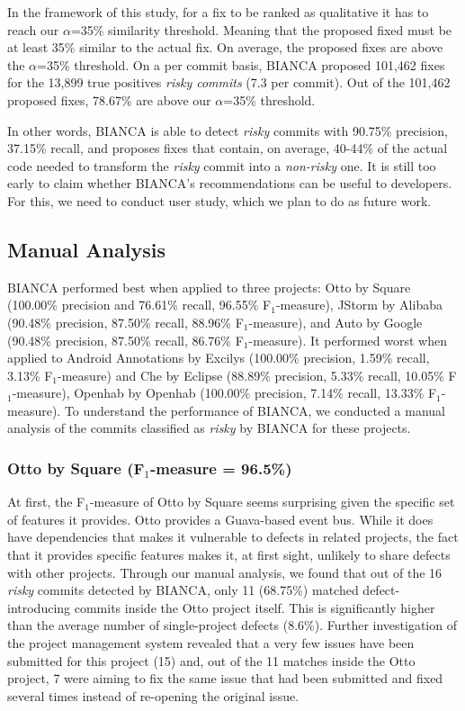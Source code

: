 In the framework of this study, for a fix to be ranked as qualitative it
has to reach our \(\alpha\)=35\% similarity threshold. Meaning that the
proposed fixed must be at least 35\% similar to the actual fix. On
average, the proposed fixes are above the \(\alpha\)=35\% threshold. On
a per commit basis, BIANCA proposed 101,462 fixes for the 13,899 true
positives \emph{risky commits} (7.3 per commit). Out of the 101,462
proposed fixes, 78.67\% are above our \(\alpha\)=35\% threshold.

In other words, BIANCA is able to detect \emph{risky} commits with
90.75\% precision, 37.15\% recall, and proposes fixes that contain, on
average, 40-44\% of the actual code needed to transform the \emph{risky}
commit into a \emph{non-risky} one. It is still too early to claim
whether BIANCA's recommendations can be useful to developers. For this,
we need to conduct user study, which we plan to do as future work.

\subsection{Manual Analysis}\label{manual-analysis}

BIANCA performed best when applied to three projects: Otto by Square
(100.00\% precision and 76.61\% recall, 96.55\% F\(_1\)-measure), JStorm
by Alibaba (90.48\% precision, 87.50\% recall, 88.96\% F\(_1\)-measure),
and Auto by Google (90.48\% precision, 87.50\% recall, 86.76\%
F\(_1\)-measure). It performed worst when applied to Android Annotations
by Excilys (100.00\% precision, 1.59\% recall, 3.13\% F\(_1\)-measure)
and Che by Eclipse (88.89\% precision, 5.33\% recall, 10.05\%
F\(_1\)-measure), Openhab by Openhab (100.00\% precision, 7.14\% recall,
13.33\% F\(_1\)-measure). To understand the performance of BIANCA, we
conducted a manual analysis of the commits classified as \emph{risky} by
BIANCA for these projects.

\subsubsection{\texorpdfstring{Otto by Square (F\(_1\)-measure =
96.5\%)}{Otto by Square (F\_1-measure = 96.5\%)}}\label{otto-by-square-f_1-measure-96.5}

At first, the F\(_1\)-measure of Otto by Square seems surprising given
the specific set of features it provides. Otto provides a Guava-based
event bus. While it does have dependencies that makes it vulnerable to
defects in related projects, the fact that it provides specific features
makes it, at first sight, unlikely to share defects with other projects.
Through our manual analysis, we found that out of the 16 \emph{risky}
commits detected by BIANCA, only 11 (68.75\%) matched defect-introducing
commits inside the Otto project itself. This is significantly higher
than the average number of single-project defects (8.6\%). Further
investigation of the project management system revealed that a very few
issues have been submitted for this project (15) and, out of the 11
matches inside the Otto project, 7 were aiming to fix the same issue
that had been submitted and fixed several times instead of re-opening
the original issue.

